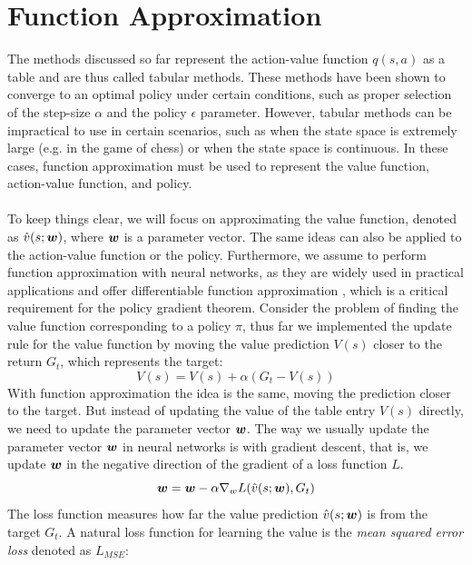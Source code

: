 \section{Function Approximation}
The methods discussed so far represent the action-value function $q(s, a)$ as a table and are thus called tabular methods. These methods have been shown to converge to an optimal policy under certain conditions, such as proper selection of the step-size $\alpha$ and the policy $\epsilon$ parameter. However, tabular methods can be impractical to use in certain scenarios, such as when the state space is extremely large (e.g. in the game of chess) or when the state space is continuous. In these cases, function approximation must be used to represent the value function, action-value function, and policy.\\\\
To keep things clear, we will focus on approximating the value function, denoted as $\hat{v}(s; \boldsymbol{w})$, where $\boldsymbol{w}$ is a parameter vector. The same ideas can also be applied to the action-value function or the policy. Furthermore, we assume to perform function approximation with neural networks, as they are widely used in practical applications and offer differentiable function approximation \cite{lecun2015deep}, which is a critical requirement for the policy gradient theorem.
Consider the problem of finding the value function corresponding to a policy $\pi$, thus far we implemented the update rule for the value function by moving the value prediction $V(s)$ closer to the return $G_t$, which represents the target:
\begin{equation}
    V(s) = V(s) + \alpha (G_t - V(s))
    \label{eq:tabular-update}
\end{equation}
With function approximation the idea is the same, moving the prediction closer to the target. But instead of updating the value of the table entry $V(s)$ directly, we need to update the parameter vector $\boldsymbol{w}$. The way we usually update the parameter vector $\boldsymbol{w}$ in neural networks is with gradient descent, that is, we update $\boldsymbol{w}$ in the negative direction of the gradient of a loss function $L$.
\begin{equation}
    \boldsymbol{w} = \boldsymbol{w} - \alpha \nabla_w L(\hat{v}(s; \boldsymbol{w}), G_t)
    \label{eq:nn-update}
\end{equation}
The loss function measures how far the value prediction $\hat{v}(s; \boldsymbol{w})$ is from the target $G_t$. A natural loss function for learning the value is the \textit{mean squared error loss} denoted as $L_{MSE}$:
